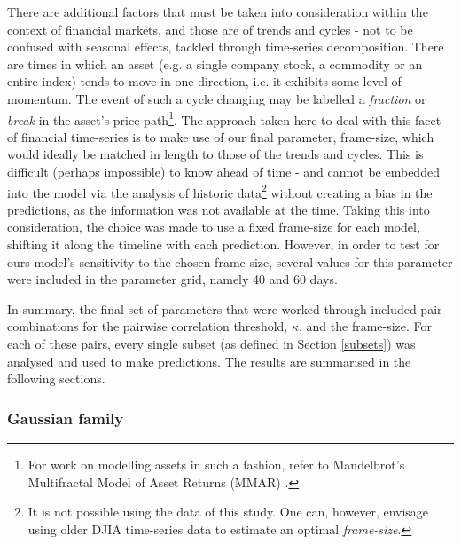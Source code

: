 \documentclass{article}
\begin{document}
There are additional factors that must be taken into consideration within the context of financial markets, and those are of trends and cycles - not to be confused with seasonal effects, tackled through time-series decomposition. There are times in which an asset (e.g. a single company stock, a commodity or an entire index) tends to move in one direction, i.e. it exhibits some level of momentum. The event of such a cycle changing may be labelled a \emph{fraction} or \emph{break} in the asset's price-path\footnote{For work on modelling assets in such a fashion, refer to Mandelbrot's Multifractal Model of Asset Returns (MMAR) \cite{mandelbrot1997multifractal} \cite{calvet1997large} \cite{fisher1997multifractality}.}. The approach taken here to deal with this facet of financial time-series is to make use of our final parameter, frame-size, which would ideally be matched in length to those of the trends and cycles. This is difficult (perhaps impossible) to know ahead of time - and cannot be embedded into the model via the analysis of historic data\footnote{It is not possible using the data of this study. One can, however, envisage using older DJIA time-series data to estimate an optimal \emph{frame-size}.} without creating a bias in the predictions, as the information was not available at the time. Taking this into consideration, the choice was made to use a fixed frame-size for each model, shifting it along the timeline with each prediction. However, in order to test for ours model's sensitivity to the chosen frame-size, several values for this parameter were included in the parameter grid, namely 40 and 60 days.

In summary, the final set of parameters that were worked through included pair-combinations for the pairwise correlation threshold, $\kappa$, and the frame-size. For each of these pairs, every single subset (as defined in Section \ref{subsets}) was analysed and used to make predictions. The results are summarised in the following sections.   


\subsubsection{Gaussian family  \label{results-gauss}}
\label{sec-6-4-2}
\end{document}
